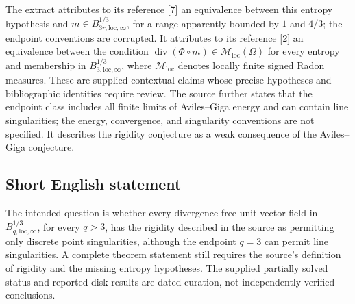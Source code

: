\documentclass[11pt]{article}
\begin{document}
The extract attributes to its reference [7] an equivalence between this entropy hypothesis and \(m\in B^{1/3}_{3r,\mathrm{loc},\infty}\), for a range apparently bounded by \(1\) and \(4/3\); the endpoint conventions are corrupted. It attributes to its reference [2] an equivalence between the condition \(\operatorname{div}(\Phi\circ m)\in\mathcal M_{\mathrm{loc}}(\Omega)\) for every entropy and membership in \(B^{1/3}_{3,\mathrm{loc},\infty}\), where \(\mathcal M_{\mathrm{loc}}\) denotes locally finite signed Radon measures. These are supplied contextual claims whose precise hypotheses and bibliographic identities require review. The source further states that the endpoint class includes all finite limits of Aviles--Giga energy and can contain line singularities; the energy, convergence, and singularity conventions are not specified. It describes the rigidity conjecture as a weak consequence of the Aviles--Giga conjecture.
\subsection{Short English statement}
The intended question is whether every divergence-free unit vector field in \(B^{1/3}_{q,\mathrm{loc},\infty}\), for every \(q>3\), has the rigidity described in the source as permitting only discrete point singularities, although the endpoint \(q=3\) can permit line singularities. A complete theorem statement still requires the source's definition of rigidity and the missing entropy hypotheses. The supplied partially solved status and reported disk results are dated curation, not independently verified conclusions.
\end{document}
